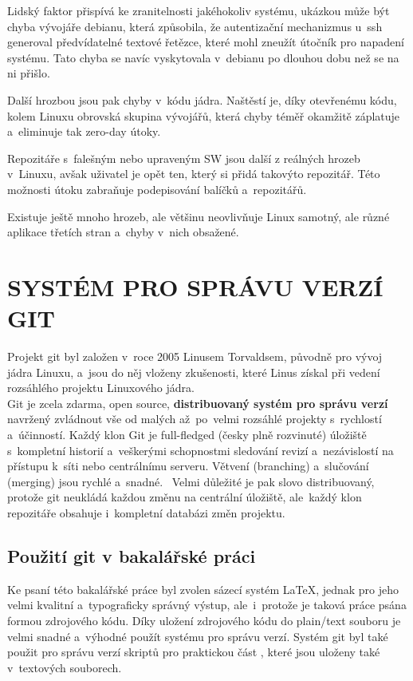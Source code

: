 \documentclass[a4paper,12pt]{article}
\newcommand{\upc}[1]{\uppercase{#1}} %
\renewcommand{\b}[1]{\textbf{#1}} %
\begin{document}
Lidský faktor přispívá ke zranitelnosti jakéhokoliv systému, ukázkou může být chyba vývojáře debianu, která způsobila, že autentizační mechanizmus u~ssh generoval předvídatelné textové řetězce, které mohl zneužít útočník pro napadení systému. Tato chyba se navíc vyskytovala v~debianu po dlouhou dobu než se na ni přišlo.~\cite{DebianSSHFail}

Další hrozbou jsou pak chyby v~kódu jádra. Naštěstí je, díky otevřenému kódu, kolem Linuxu obrovská skupina vývojářů, která chyby téměř okamžitě záplatuje a~eliminuje tak zero-day útoky.

Repozitáře s~falešným nebo upraveným SW jsou další z reálných hrozeb v~Linuxu, avšak uživatel je opět ten, který si přidá takovýto repozitář. Této možnosti útoku zabraňuje podepisování balíčků a~repozitářů.~\cite{ArchWikiPodepisovaniBalicku}

Existuje ještě mnoho hrozeb, ale většinu neovlivňuje Linux samotný, ale různé aplikace třetích stran a~chyby v~nich obsažené.

\section{\upc{Systém pro správu verzí git}}
Projekt git byl založen v~roce 2005 Linusem Torvaldsem, původně pro vývoj jádra Linuxu, a~jsou do něj vloženy zkušenosti, které Linus získal při vedení rozsáhlého projektu Linuxového jádra.~\cite{MailingListVznikGITu}\\

Git je zcela zdarma, open source, \b{distribuovaný systém pro správu verzí} navržený zvládnout vše od malých až~po~velmi rozsáhlé projekty s~rychlostí a~účinností. Každý klon Git je full-fledged (česky plně rozvinuté) úložiště s~kompletní historií a~veškerými schopnostmi sledování revizí a~nezávislostí na přístupu k~síti nebo centrálnímu serveru. Větvení (branching) a~slučování (merging) jsou rychlé a~snadné.~\cite{GITWEB} Velmi důležité je pak slovo distribuovaný, protože git neukládá každou změnu na centrální úložiště, ale~každý klon repozitáře obsahuje i~kompletní databázi změn projektu.

\subsection{Použití git v bakalářské práci}
Ke psaní této bakalářské práce byl zvolen sázecí systém \LaTeX, jednak pro jeho velmi kvalitní a~typograficky správný výstup, ale~i~protože je taková práce psána formou zdrojového kódu. Díky uložení zdrojového kódu do plain/text souboru je velmi snadné a~výhodné použít systému pro správu verzí. Systém git byl také použit pro správu verzí skriptů pro praktickou část , které jsou uloženy také v~textových souborech.
\end{document}
